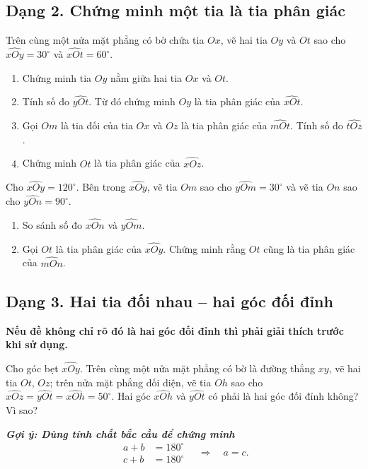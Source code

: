 \subsection{Dạng 2. Chứng minh một tia là tia phân giác}
\noindent
\begin{bt}
	Trên cùng một nửa mặt phẳng có bờ chứa tia $Ox$, vẽ hai tia $Oy$ và $Ot$
	sao cho $\widehat{xOy}=30^\circ$ và $\widehat{xOt}=60^\circ$.
	
	\begin{enumerate}[label=\alph*)]
		\item Chứng minh tia $Oy$ nằm giữa hai tia $Ox$ và $Ot$.
		
		\item Tính số đo $\widehat{yOt}$. Từ đó chứng minh $Oy$ là tia phân giác
		của $\widehat{xOt}$.
		
		\item Gọi $Om$ là tia đối của tia $Ox$ và $Oz$ là tia phân giác của
		$\widehat{mOt}$. Tính số đo $\widehat{tOz}$.
		
		\item Chứng minh $Ot$ là tia phân giác của $\widehat{xOz}$.
	\end{enumerate}
\end{bt}
\begin{bt}
	Cho $\widehat{xOy}=120^\circ$. Bên trong $\widehat{xOy}$, vẽ tia $Om$
	sao cho $\widehat{yOm}=30^\circ$ và vẽ tia $On$ sao cho
	$\widehat{yOn}=90^\circ$.
	
	\begin{enumerate}[label=\alph*)]
		\item So sánh số đo $\widehat{xOn}$ và $\widehat{yOm}$.
		
		\item Gọi $Ot$ là tia phân giác của $\widehat{xOy}$. Chứng minh rằng
		$Ot$ cũng là tia phân giác của $\widehat{mOn}$.
	\end{enumerate}
\end{bt}
\newpage
\noindent
\subsection{Dạng 3. Hai tia đối nhau -- hai góc đối đỉnh}
\begin{ghinho}
	\textbf{Nếu đề không chỉ rõ đó là hai góc đối đỉnh thì
	\textcolor{red!75!black}{phải giải thích} trước khi sử dụng.}
\end{ghinho}

\begin{bt}
	Cho góc bẹt $\widehat{xOy}$. Trên cùng một nửa mặt phẳng có bờ là đường
	thẳng $xy$, vẽ hai tia $Ot$, $Oz$; trên nửa mặt phẳng đối diện, vẽ tia
	$Oh$ sao cho $\widehat{xOz}=\widehat{yOt}=\widehat{xOh}=50^\circ.$
	Hai góc $\widehat{xOh}$ và $\widehat{yOt}$ có phải là hai góc đối đỉnh
	không? Vì sao?

\begingroup
	\bfseries\itshape\boldmath
	Gợi ý: Dùng tính chất bắc cầu để chứng minh
	\[
		\begin{aligned}
			a+b &= 180^\circ\\
			c+b &= 180^\circ
		\end{aligned}
		\quad\Longrightarrow\quad a=c.
	\]
\endgroup
\end{bt}

